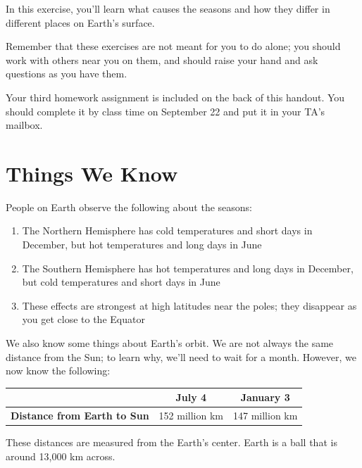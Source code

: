 \documentclass[12pt]{article}
\begin{document}
\Large
\centerline{}

\normalsize

In this exercise, you'll learn what causes the seasons and how they differ in different places on Earth's surface.

Remember that these exercises are not meant for you to do alone; you should work with others near you on them, and should raise your hand and ask questions as you have them.

Your third homework assignment is included on the back of this handout. You should complete it by class time on September 22 and put it in your TA's mailbox.

\section{Things We Know}

People on Earth observe the following about the seasons:

\begin{enumerate}
	\item The Northern Hemisphere has cold temperatures and short days in December, but hot temperatures and long days in June
	
	\item The Southern Hemisphere has hot temperatures and long days in December, but cold temperatures and short days in June
	
	\item These effects are strongest at high latitudes near the poles; they disappear as you get close to the Equator
\end{enumerate}

We also know some things about Earth's orbit. We are not always the same distance from the Sun; to learn why, we'll need to wait for a month. However, we now know the following:

\begin{center}
\begin{tabular}{|c|c|c|}
	\hline
	\null & \bf{July 4} & \bf{January 3} \\ \hline
	{\bf Distance from Earth to Sun} & 152 million km & 147 million km \\ \hline
\end{tabular}
\end{center}

These distances are measured from the Earth's center. Earth is a ball that is around 13,000 km across.
\end{document}
